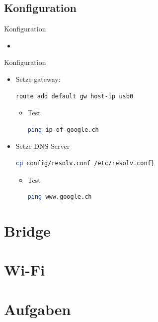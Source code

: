 \documentclass{beamer}
\begin{document}
\subsection{Konfiguration}
\begin{frame}[fragile]{Konfiguration}{\host}
  \begin{itemize}
  \item {}
  \end{itemize}
\end{frame}

\begin{frame}[fragile]{Konfiguration}{\target}
  \begin{itemize}
  \item Setze gateway:
  \begin{lstlisting}[language=bash]
route add default gw host-ip usb0
  \end{lstlisting}
  \begin{itemize}
  \item Test 
  \begin{lstlisting}[language=bash]
ping ip-of-google.ch  
  \end{lstlisting}
  \end{itemize}
  \item Setze DNS Server
  \begin{lstlisting}[language=bash]
cp config/resolv.conf /etc/resolv.conf}

  \end{lstlisting}
  \begin{itemize}
   \item Test 
   \begin{lstlisting}[language=bash]
ping www.google.ch 
   \end{lstlisting}
  \end{itemize}
  \end{itemize}
\end{frame}

\section{Bridge}

\section{Wi-Fi}


\section{Aufgaben}
\end{document}
